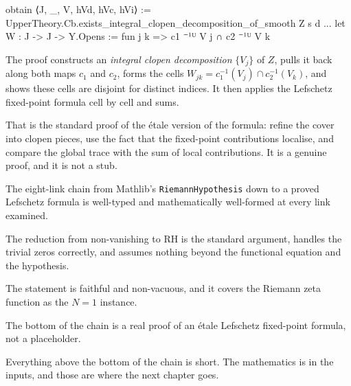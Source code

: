 \begin{leanquote}
  obtain ⟨J, _, V, hVd, hVc, hVi⟩ :=
    UpperTheory.Cb.exists_integral_clopen_decomposition_of_smooth Z s d
  ...
  let W : J -> J -> Y.Opens := fun j k => c1 ⁻¹ᵁ V j ∩ c2 ⁻¹ᵁ V k
\end{leanquote}

The proof constructs an \emph{integral clopen decomposition} $\{V_j\}$ of $Z$,
pulls it back along both maps $c_1$ and $c_2$, forms the cells
$W_{jk} = c_1^{-1}(V_j) \cap c_2^{-1}(V_k)$, and shows these cells are
disjoint for distinct indices. It then applies the Lefschetz fixed-point
formula cell by cell and sums.

That is the standard proof of the étale version of the formula: refine the
cover into clopen pieces, use the fact that the fixed-point contributions
localise, and compare the global trace with the sum of local contributions.
It is a genuine proof, and it is not a stub.

\begin{keytakeaways}

\item The eight-link chain from Mathlib's \texttt{RiemannHypothesis} down to a
proved Lefschetz formula is well-typed and mathematically well-formed at every
link examined.
\item The reduction from non-vanishing to RH is the standard argument, handles
the trivial zeros correctly, and assumes nothing beyond the functional
equation and the hypothesis.
\item The statement  is faithful and
non-vacuous, and it covers the Riemann zeta function as the $N=1$ instance.
\item The bottom of the chain is a real proof of an étale Lefschetz fixed-point
formula, not a placeholder.
\item Everything above the bottom of the chain is short. The mathematics is in
the inputs, and those are where the next chapter goes.
\end{keytakeaways}
